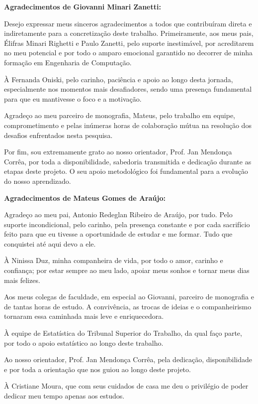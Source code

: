 \textbf{Agradecimentos de Giovanni Minari Zanetti:}

Desejo expressar meus sinceros agradecimentos a todos que contribuíram direta e indiretamente para a concretização deste trabalho. Primeiramente, aos meus pais, Élifras Minari Righetti e Paulo Zanetti, pelo suporte inestimável, por acreditarem no meu potencial e por todo o amparo emocional garantido no decorrer de minha formação em Engenharia de Computação.

À Fernanda Oniski, pelo carinho, paciência e apoio ao longo desta jornada, especialmente nos momentos mais desafiadores, sendo uma presença fundamental para que eu mantivesse o foco e a motivação.

Agradeço ao meu parceiro de monografia, Mateus, pelo trabalho em equipe, comprometimento e pelas inúmeras horas de colaboração mútua na resolução dos desafios enfrentados nesta pesquisa.

Por fim, sou extremamente grato ao nosso orientador, Prof. Jan Mendonça Corrêa, por toda a disponibilidade, sabedoria transmitida e dedicação durante as etapas deste projeto. O seu apoio metodológico foi fundamental para a evolução do nosso aprendizado.

\newpage
\thispagestyle{empty}

\textbf{Agradecimentos de Mateus Gomes de Araújo:}

Agradeço ao meu pai, Antonio Redeglan Ribeiro de Araújo, por tudo. Pelo suporte incondicional, pelo carinho, pela presença constante e por cada sacrifício feito para que eu tivesse a oportunidade de estudar e me formar. Tudo que conquistei até aqui devo a ele.

À Ninissa Duz, minha companheira de vida, por todo o amor, carinho e confiança; por estar sempre ao meu lado, apoiar meus sonhos e tornar meus dias mais felizes.

Aos meus colegas de faculdade, em especial ao Giovanni, parceiro de monografia e de tantas horas de estudo. A convivência, as trocas de ideias e o companheirismo tornaram essa caminhada mais leve e enriquecedora.

À equipe de Estatística do Tribunal Superior do Trabalho, da qual faço parte, por todo o apoio estatístico ao longo deste trabalho.

Ao nosso orientador, Prof. Jan Mendonça Corrêa, pela dedicação, disponibilidade e por toda a orientação que nos guiou ao longo deste projeto.

À Cristiane Moura, que com seus cuidados de casa me deu o privilégio de poder dedicar meu tempo apenas aos estudos.
